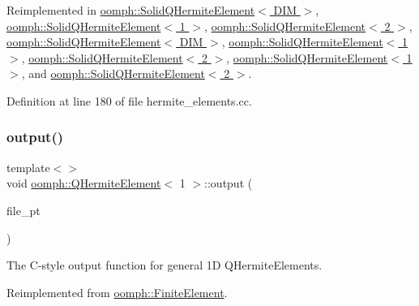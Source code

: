 Reimplemented in \hyperlink{classoomph_1_1SolidQHermiteElement_ade1e06d5bf37699c512cd91c013dd1e9}{oomph\+::\+Solid\+Q\+Hermite\+Element$<$ D\+I\+M $>$}, \hyperlink{classoomph_1_1SolidQHermiteElement_ade1e06d5bf37699c512cd91c013dd1e9}{oomph\+::\+Solid\+Q\+Hermite\+Element$<$ 1 $>$}, \hyperlink{classoomph_1_1SolidQHermiteElement_ade1e06d5bf37699c512cd91c013dd1e9}{oomph\+::\+Solid\+Q\+Hermite\+Element$<$ 2 $>$}, \hyperlink{classoomph_1_1SolidQHermiteElement_adef773329622efbbe113755da62a9cae}{oomph\+::\+Solid\+Q\+Hermite\+Element$<$ D\+I\+M $>$}, \hyperlink{classoomph_1_1SolidQHermiteElement_adef773329622efbbe113755da62a9cae}{oomph\+::\+Solid\+Q\+Hermite\+Element$<$ 1 $>$}, \hyperlink{classoomph_1_1SolidQHermiteElement_adef773329622efbbe113755da62a9cae}{oomph\+::\+Solid\+Q\+Hermite\+Element$<$ 2 $>$}, \hyperlink{classoomph_1_1SolidQHermiteElement_ab86bacc26f319f3266e6de9cfc5b82af}{oomph\+::\+Solid\+Q\+Hermite\+Element$<$ 1 $>$}, and \hyperlink{classoomph_1_1SolidQHermiteElement_ab86bacc26f319f3266e6de9cfc5b82af}{oomph\+::\+Solid\+Q\+Hermite\+Element$<$ 2 $>$}.



Definition at line 180 of file hermite\+\_\+elements.\+cc.

\mbox{\label{classoomph_1_1QHermiteElement_ad46a3ab51b36d24c7bf101f52722bf4f}} 
\subsubsection{\texorpdfstring{output()}{output()}\hspace{0.1cm}{\footnotesize\ttfamily [3/12]}}
{\footnotesize\ttfamily template$<$$>$ \\
void \hyperlink{classoomph_1_1QHermiteElement}{oomph\+::\+Q\+Hermite\+Element}$<$ 1 $>$\+::output (\begin{DoxyParamCaption}\item[{F\+I\+LE $\ast$}]{file\+\_\+pt }\end{DoxyParamCaption})\hspace{0.3cm}{\ttfamily [virtual]}}



The C-\/style output function for general 1D Q\+Hermite\+Elements. 



Reimplemented from \hyperlink{classoomph_1_1FiniteElement_a72cddd09f8ddbee1a20a1ff404c6943e}{oomph\+::\+Finite\+Element}.



